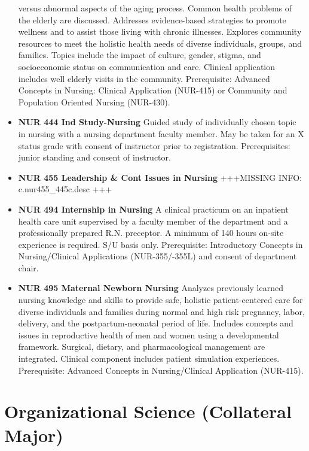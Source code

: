 \documentclass[
  letterpaper,
]{scrbook}
\begin{document}
\begin{itemize}
  versus abnormal aspects of the aging process. Common health problems
  of the elderly are discussed. Addresses evidence-based strategies to
  promote wellness and to assist those living with chronic illnesses.
  Explores community resources to meet the holistic health needs of
  diverse individuals, groups, and families. Topics include the impact
  of culture, gender, stigma, and socioeconomic status on communication
  and care. Clinical application includes well elderly visits in the
  community. Prerequisite: Advanced Concepts in Nursing: Clinical
  Application (NUR-415) or Community and Population Oriented Nursing
  (NUR-430).
\item
  \textbf{NUR 444 Ind Study-Nursing} Guided study of individually chosen
  topic in nursing with a nursing department faculty member. May be
  taken for an X status grade with consent of instructor prior to
  registration. Prerequisites: junior standing and consent of
  instructor.
\item
  \textbf{NUR 455 Leadership \& Cont Issues in Nursing} +++MISSING INFO:
  c.nur455\_445c.desc +++
\item
  \textbf{NUR 494 Internship in Nursing} A clinical practicum on an
  inpatient health care unit supervised by a faculty member of the
  department and a professionally prepared R.N. preceptor. A minimum of
  140 hours on-site experience is required. S/U basis only.
  Prerequisite: Introductory Concepts in Nursing/Clinical Applications
  (NUR-355/-355L) and consent of department chair.
\item
  \textbf{NUR 495 Maternal Newborn Nursing} Analyzes previously learned
  nursing knowledge and skills to provide safe, holistic
  patient-centered care for diverse individuals and families during
  normal and high risk pregnancy, labor, delivery, and the
  postpartum-neonatal period of life. Includes concepts and issues in
  reproductive health of men and women using a developmental framework.
  Surgical, dietary, and pharmacological management are integrated.
  Clinical component includes patient simulation experiences.
  Prerequisite: Advanced Concepts in Nursing/Clinical Application
  (NUR-415).
\end{itemize}

\hypertarget{sec-organizational-science}{%
\section{Organizational Science (Collateral
Major)}\label{sec-organizational-science}}
\end{document}
